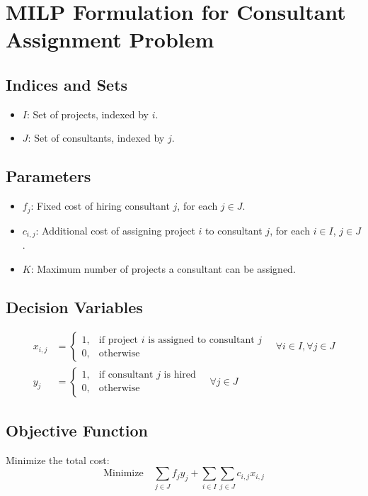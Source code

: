 \documentclass{article}
\begin{document}
\section*{MILP Formulation for Consultant Assignment Problem}

\subsection*{Indices and Sets}
\begin{itemize}
    \item $I$: Set of projects, indexed by $i$.
    \item $J$: Set of consultants, indexed by $j$.
\end{itemize}

\subsection*{Parameters}
\begin{itemize}
    \item $f_j$: Fixed cost of hiring consultant $j$, for each $j \in J$.
    \item $c_{i,j}$: Additional cost of assigning project $i$ to consultant $j$, for each $i \in I$, $j \in J$.
    \item $K$: Maximum number of projects a consultant can be assigned.
\end{itemize}

\subsection*{Decision Variables}
\begin{align*}
    x_{i,j} &= 
    \begin{cases} 
    1, & \text{if project $i$ is assigned to consultant $j$} \\ 
    0, & \text{otherwise}
    \end{cases} \quad \forall i \in I, \forall j \in J \\
    y_j &= 
    \begin{cases} 
    1, & \text{if consultant $j$ is hired} \\ 
    0, & \text{otherwise}
    \end{cases} \quad \forall j \in J
\end{align*}

\subsection*{Objective Function}
Minimize the total cost:
\[
\text{Minimize} \quad \sum_{j \in J} f_j y_j + \sum_{i \in I} \sum_{j \in J} c_{i,j} x_{i,j}
\]
\end{document}
